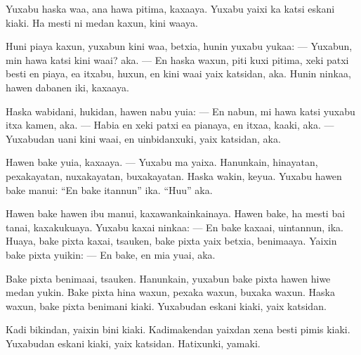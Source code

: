 Yuxabu haska waa, ana hawa pitima,
kaxaaya. Yuxabu yaixi ka katsi eskani kiaki.
Ha mesti ni medan kaxun, kini waaya.

Huni piaya kaxun, yuxabun kini
waa, betxia, hunin yuxabu yukaa:
— Yuxabun, min hawa
katsi kini waai? aka.
— En haska waxun, piti kuxi
pitima, xeki patxi besti en piaya,
ea itxabu, huxun, en kini waai
yaix katsidan, aka.
Hunin ninkaa, hawen
dabanen iki, kaxaaya.

Haska wabidani, hukidan,
hawen nabu yuia:
— En nabun, mi hawa
katsi yuxabu
itxa kamen, aka.
— Habia en xeki patxi
ea pianaya,
en itxaa, kaaki, aka.
—Yuxabudan uani kini
waai, en uinbidanxuki,
yaix katsidan, aka.

Hawen bake yuia, kaxaaya.
— Yuxabu ma yaixa. Hanunkain, hinayatan,
pexakayatan, nuxakayatan, buxakayatan.
Haska wakin, keyua. Yuxabu hawen bake
manui: “En bake itannun” ika. “Huu” aka.

Hawen bake hawen ibu
manui, kaxawankainkainaya.
Hawen bake, ha mesti bai
tanai, kaxakukuaya.
Yuxabu kaxai ninkaa:
— En bake kaxaai, uintannun, ika.
Huaya, bake pixta kaxai, tsauken,
bake pixta yaix betxia, benimaaya.
Yaixin bake pixta yuikin:
— En bake, en mia yuai, aka.

Bake pixta benimaai, tsauken.
Hanunkain, yuxabun bake pixta
hawen hiwe medan yukin.
Bake pixta hina waxun, pexaka
waxun, buxaka waxun.
Haska waxun, bake pixta
benimani kiaki.
Yuxabudan eskani kiaki,
yaix katsidan.

Kadi bikindan, yaixin bini kiaki.
Kadimakendan yaixdan
xena besti pimis kiaki.
Yuxabudan eskani kiaki, yaix
katsidan. Hatixunki, yamaki.